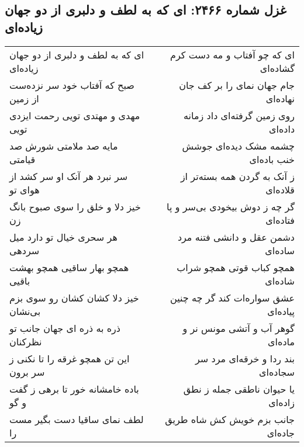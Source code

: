 \begin{center}
\section*{غزل شماره ۲۴۶۶: ای که به لطف و دلبری از دو جهان زیاده‌ای}
\label{sec:2466}
\begin{longtable}{l p{0.5cm} r}
ای که به لطف و دلبری از دو جهان زیاده‌ای
&&
ای که چو آفتاب و مه دست کرم گشاده‌ای
\\
صبح که آفتاب خود سر نزده‌ست از زمین
&&
جام جهان نمای را بر کف جان نهاده‌ای
\\
مهدی و مهتدی تویی رحمت ایزدی تویی
&&
روی زمین گرفته‌ای داد زمانه داده‌ای
\\
مایه صد ملامتی شورش صد قیامتی
&&
چشمه مشک دیده‌ای جوشش خنب باده‌ای
\\
سر نبرد هر آنک او سر کشد از هوای تو
&&
ز آنک به گردن همه بسته‌تر از قلاده‌ای
\\
خیز دلا و خلق را سوی صبوح بانگ زن
&&
گر چه ز دوش بیخودی بی‌سر و پا فتاده‌ای
\\
هر سحری خیال تو دارد میل سردهی
&&
دشمن عقل و دانشی فتنه مرد ساده‌ای
\\
همچو بهار ساقیی همچو بهشت باقیی
&&
همچو کباب قوتی همچو شراب شاده‌ای
\\
خیز دلا کشان کشان رو سوی بزم بی‌نشان
&&
عشق سواره‌ات کند گر چه چنین پیاده‌ای
\\
ذره به ذره ای جهان جانب تو نظرکنان
&&
گوهر آب و آتشی مونس نر و ماده‌ای
\\
این تن همچو غرقه را تا نکنی ز سر برون
&&
بند ردا و خرقه‌ای مرد سر سجاده‌ای
\\
باده خامشانه خور تا برهی ز گفت و گو
&&
یا حیوان ناطقی جمله ز نطق زاده‌ای
\\
لطف نمای ساقیا دست بگیر مست را
&&
جانب بزم خویش کش شاه طریق جاده‌ای
\\
\end{longtable}
\end{center}
